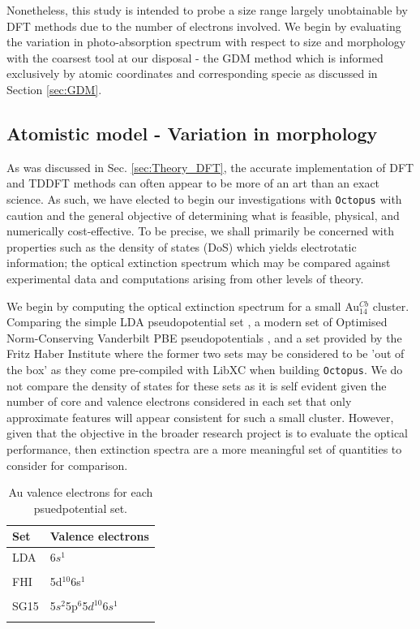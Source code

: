 Nonetheless, this study is intended to probe a size range largely unobtainable by DFT methods due to the number of electrons involved. We begin by evaluating the variation in photo-absorption spectrum with respect to size and morphology with the coarsest tool at our disposal - the GDM method which is informed exclusively by atomic coordinates and corresponding specie as discussed in Section \ref{sec:GDM}.

\subsection{Atomistic model - Variation in morphology}
\label{sec:Res_Atom}
As was discussed in Sec. \ref{sec:Theory_DFT}, the accurate implementation of DFT and TDDFT methods can often appear to be more of an art than an exact science. As such, we have elected to begin our investigations with \texttt{Octopus} \cite{Octopus2003,Octopus_2006,Oct_paralel,Oct_2015,Oct_2020} with caution and the general objective of determining what is feasible, physical, and numerically cost-effective. To be precise, we shall primarily be concerned with properties such as the density of states (DoS) which yields electrotatic information; the optical extinction spectrum which may be compared against experimental data and computations arising from other levels of theory.

We begin by computing the optical extinction spectrum for a small Au$_{14}^{Cb}$ cluster. Comparing the simple LDA pseudopotential set \cite{PhysRevB.58.3641}, a modern set of Optimised Norm-Conserving Vanderbilt PBE pseudopotentials \cite{SCHLIPF201536}, and a set provided by the Fritz Haber Institute where the former two sets may be considered to be 'out of the box' as they come pre-compiled with LibXC \cite{LibXC} when building \texttt{Octopus}. We do not compare the density of states for these sets as it is self evident given the number of core and valence electrons considered in each set that only approximate features will appear consistent for such a small cluster. However, given that the objective in the broader research project is to evaluate the optical performance, then extinction spectra are a more meaningful set of quantities to consider for comparison.

\begin{table}[ht]
\centering
\caption{Au valence electrons for each psuedpotential set.}
\label{tab:pseudos}
\begin{tabular}{@{}ll@{}}
\toprule
Set & Valence electrons  \\
\hline
LDA \cite{PhysRevB.58.3641} &  6$s^{1}$   \\ \\
FHI \cite{FHI}  &  5d$^{10}$6s$^{1}$   \\ \\
SG15 \cite{SCHLIPF201536} &   5$s^{2}$5p$^{6}$5$d^{10}$6$s^{1}$    \\ \\
\bottomrule
\end{tabular}
\end{table}

